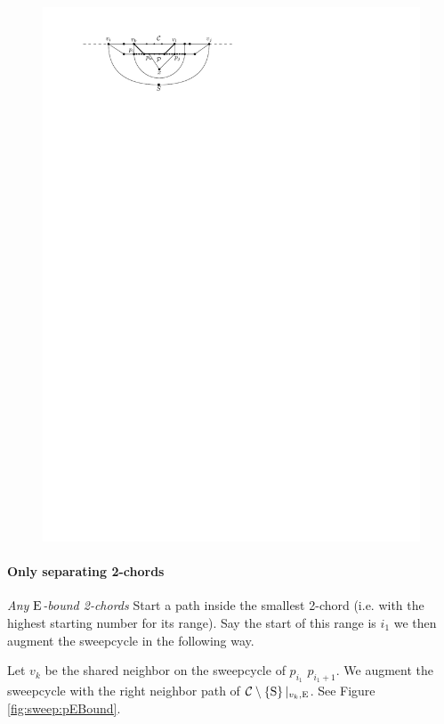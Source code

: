     \begin{figure}[h]
      \centering
      \includegraphics[scale=1]{unifiedAlgo/img/2chordInChordUpdate}
      \caption{}
      \label{fig:sweep:2chordInChordUpdate}
    \end{figure}

    \paragraph{Only separating 2-chords}
    \emph{Any $\mathrm{E}$-bound 2-chords}
    Start a path inside the smallest 2-chord (i.e. with the highest starting number for its range). Say the start of this range is $i_1$ we then augment the sweepcycle in the following way.

    Let $v_k$ be the shared neighbor on the sweepcycle of $p_{i_1}$ $p_{i_1 +1}$. We augment the sweepcycle with the right neighbor path of $\mathcal{C} \setminus \left\lbrace {\mathrm{S}} \right\rbrace|_{v_k, \mathrm{E}}$. See Figure \ref{fig:sweep:pEBound}.

